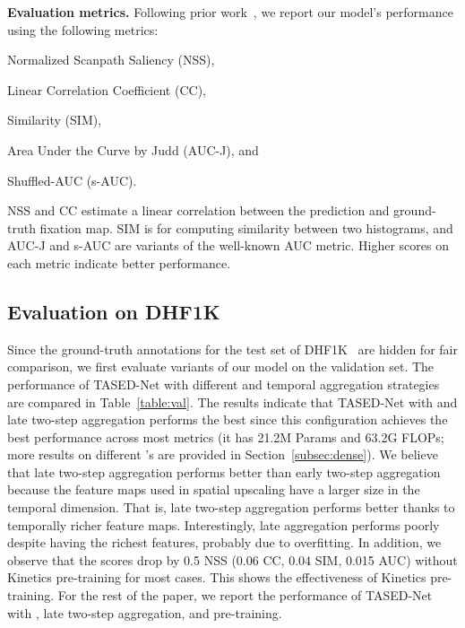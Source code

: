 \documentclass[10pt,twocolumn,letterpaper]{article}
\newcommand{\modelname}{TASED-Net}
\begin{document}
\textbf{Evaluation metrics.} Following prior work~\cite{wang2018revisiting}, we report our model's performance using the following metrics:
\begin{inlinelist}
 \item Normalized Scanpath Saliency (NSS),
 \item Linear Correlation Coefficient (CC),
 \item Similarity (SIM),
 \item Area Under the Curve by Judd (AUC-J), and
 \item Shuffled-AUC (s-AUC).
\end{inlinelist}
 NSS and CC estimate a linear correlation between the prediction and ground-truth fixation map. SIM is for computing similarity between two histograms, and AUC-J and s-AUC are variants of the well-known AUC metric. Higher scores on each metric indicate better performance.

\subsection{Evaluation on DHF1K} \label{subsec:on-dhf1k}

Since the ground-truth annotations for the test set of DHF1K~\cite{wang2018revisiting} are hidden for fair comparison, we first evaluate variants of our model on the validation set. The performance of \modelname{} with different  and temporal aggregation strategies are compared in Table~\ref{table:val}. The results indicate that \modelname{} with  and late two-step aggregation performs the best since this configuration achieves the best performance across most metrics (it has 21.2M Params and 63.2G FLOPs; more results on different 's are provided in Section~\ref{subsec:dense}). We believe that late two-step aggregation performs better than early two-step aggregation because the feature maps used in spatial upscaling have a larger size in the temporal dimension. That is, late two-step aggregation performs better thanks to temporally richer feature maps. Interestingly, late aggregation performs poorly despite having the richest features, probably due to overfitting. In addition, we observe that the scores drop by 0.5 NSS (0.06 CC, 0.04 SIM, 0.015 AUC) without Kinetics pre-training for most cases. This shows the effectiveness of Kinetics pre-training. For the rest of the paper, we report the performance of \modelname{} with , late two-step aggregation, and pre-training.
\end{document}
